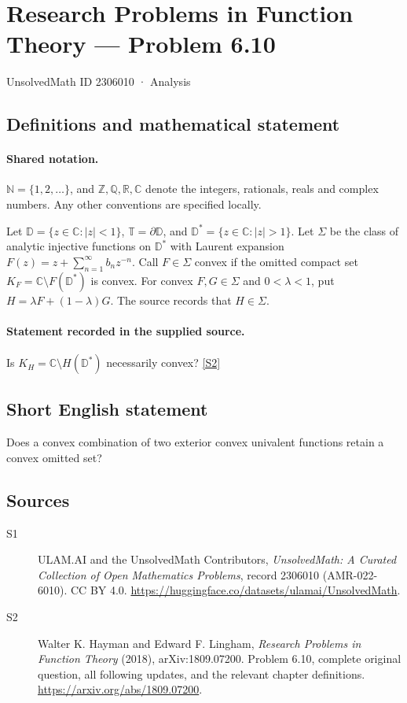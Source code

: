 \documentclass[11pt]{book}
\newcommand{\sref}[2]{\hyperlink{source:#1:#2}{[S#2]}}
\begin{document}
\setcounter{section}{2306009}
\section{Research Problems in Function Theory — Problem 6.10}\label{2306010}
{\small\sffamily UnsolvedMath ID 2306010 · Analysis}
\subsection{Definitions and mathematical statement}

\paragraph{Shared notation.}$\mathbb N=\{1,2,\ldots\}$, and $\mathbb Z,\mathbb Q,\mathbb R,\mathbb C$ denote the integers, rationals, reals and complex numbers. Any other conventions are specified locally.


Let $\mathbb D=\{z\in\mathbb C:|z|<1\}$, $\mathbb T=\partial\mathbb D$, and $\mathbb D^*=\{z\in\mathbb C:|z|>1\}$. Let $\Sigma$ be the class of analytic injective functions on $\mathbb D^*$ with Laurent expansion $F(z)=z+\sum_{n=1}^{\infty}b_nz^{-n}$. Call $F\in\Sigma$ convex if the omitted compact set $K_F=\mathbb C\setminus F(\mathbb D^*)$ is convex. For convex $F,G\in\Sigma$ and $0<\lambda<1$, put $H=\lambda F+(1-\lambda)G$. The source records that $H\in\Sigma$.
\paragraph{Statement recorded in the supplied source.}
Is $K_H=\mathbb C\setminus H(\mathbb D^*)$ necessarily convex? \sref{2306010}{2}
\subsection{Short English statement}
Does a convex combination of two exterior convex univalent functions retain a convex omitted set?
\subsection{Sources}
\begin{description}
\item[\hypertarget{source:2306010:1}{S1}] ULAM.AI and the UnsolvedMath Contributors, \emph{UnsolvedMath: A Curated Collection of Open Mathematics Problems}, record 2306010 (AMR-022-6010). CC BY 4.0. \url{https://huggingface.co/datasets/ulamai/UnsolvedMath}.
\item[\hypertarget{source:2306010:2}{S2}] Walter K. Hayman and Edward F. Lingham, \emph{Research Problems in Function Theory} (2018), arXiv:1809.07200. Problem 6.10, complete original question, all following updates, and the relevant chapter definitions. \url{https://arxiv.org/abs/1809.07200}.
\end{description}
\label{end:2306010}
\end{document}
